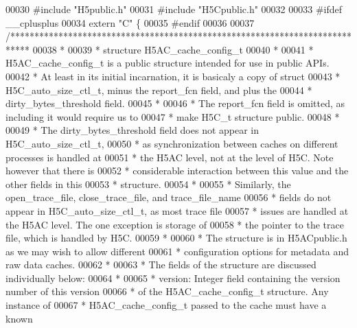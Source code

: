 \begin{DoxyCode}
00030 \textcolor{preprocessor}{#include "H5public.h"}
00031 \textcolor{preprocessor}{#include "H5Cpublic.h"}
00032 
00033 \textcolor{preprocessor}{#ifdef \_\_cplusplus}
00034 \textcolor{keyword}{extern} \textcolor{stringliteral}{"C"} \{
00035 \textcolor{preprocessor}{#endif}
00036 
00037 \textcolor{comment}{/****************************************************************************}
00038 \textcolor{comment}{ *}
00039 \textcolor{comment}{ * structure H5AC\_cache\_config\_t}
00040 \textcolor{comment}{ *}
00041 \textcolor{comment}{ * H5AC\_cache\_config\_t is a public structure intended for use in public APIs.}
00042 \textcolor{comment}{ * At least in its initial incarnation, it is basicaly a copy of struct}
00043 \textcolor{comment}{ * H5C\_auto\_size\_ctl\_t, minus the report\_fcn field, and plus the}
00044 \textcolor{comment}{ * dirty\_bytes\_threshold field.}
00045 \textcolor{comment}{ *}
00046 \textcolor{comment}{ * The report\_fcn field is omitted, as including it would require us to}
00047 \textcolor{comment}{ * make H5C\_t structure public.}
00048 \textcolor{comment}{ *}
00049 \textcolor{comment}{ * The dirty\_bytes\_threshold field does not appear in H5C\_auto\_size\_ctl\_t,}
00050 \textcolor{comment}{ * as synchronization between caches on different processes is handled at}
00051 \textcolor{comment}{ * the H5AC level, not at the level of H5C.  Note however that there is}
00052 \textcolor{comment}{ * considerable interaction between this value and the other fields in this}
00053 \textcolor{comment}{ * structure.}
00054 \textcolor{comment}{ *}
00055 \textcolor{comment}{ * Similarly, the open\_trace\_file, close\_trace\_file, and trace\_file\_name}
00056 \textcolor{comment}{ * fields do not appear in H5C\_auto\_size\_ctl\_t, as most trace file}
00057 \textcolor{comment}{ * issues are handled at the H5AC level.  The one exception is storage of}
00058 \textcolor{comment}{ * the pointer to the trace file, which is handled by H5C.}
00059 \textcolor{comment}{ *}
00060 \textcolor{comment}{ * The structure is in H5ACpublic.h as we may wish to allow different}
00061 \textcolor{comment}{ * configuration options for metadata and raw data caches.}
00062 \textcolor{comment}{ *}
00063 \textcolor{comment}{ * The fields of the structure are discussed individually below:}
00064 \textcolor{comment}{ *}
00065 \textcolor{comment}{ * version: Integer field containing the version number of this version}
00066 \textcolor{comment}{ *      of the H5AC\_cache\_config\_t structure.  Any instance of}
00067 \textcolor{comment}{ *      H5AC\_cache\_config\_t passed to the cache must have a known}

\end{DoxyCode}
